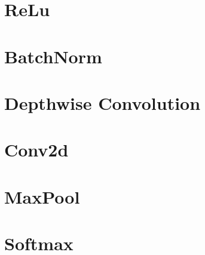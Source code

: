 \documentclass[12pt]{amsart}
\theoremstyle{plain}
\theoremstyle{definition}
\theoremstyle{definition}
\theoremstyle{definition}
\theoremstyle{definition}
\theoremstyle{definition}
\begin{document}
\section{ReLu}


\section{BatchNorm}


\section{Depthwise Convolution}


\section{Conv2d}


\section{MaxPool}


\section{Softmax}



 

\end{document}
